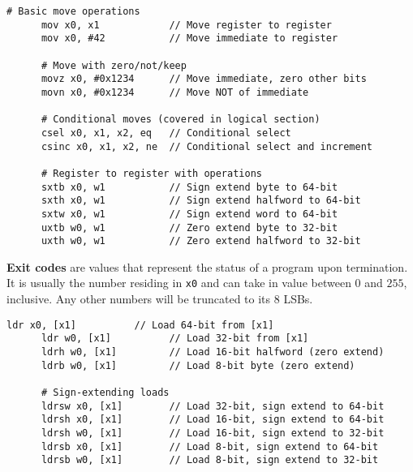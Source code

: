   \begin{definition}
    \begin{lstlisting}[language=arm]
      # Basic move operations
      mov x0, x1            // Move register to register
      mov x0, #42           // Move immediate to register
      
      # Move with zero/not/keep
      movz x0, #0x1234      // Move immediate, zero other bits
      movn x0, #0x1234      // Move NOT of immediate
      
      # Conditional moves (covered in logical section)
      csel x0, x1, x2, eq   // Conditional select
      csinc x0, x1, x2, ne  // Conditional select and increment
      
      # Register to register with operations
      sxtb x0, w1           // Sign extend byte to 64-bit
      sxth x0, w1           // Sign extend halfword to 64-bit
      sxtw x0, w1           // Sign extend word to 64-bit
      uxtb w0, w1           // Zero extend byte to 32-bit
      uxth w0, w1           // Zero extend halfword to 32-bit
    \end{lstlisting}
  \end{definition} 

  \begin{definition}
    \textbf{Exit codes} are values that represent the status of a program upon termination. It is usually the number residing in \texttt{x0} and can take in value between $0$ and $255$, inclusive. Any other numbers will be truncated to its 8 LSBs. 
  \end{definition}

  \begin{definition}
    \begin{lstlisting}[language=arm]
      ldr x0, [x1]          // Load 64-bit from [x1]
      ldr w0, [x1]          // Load 32-bit from [x1]
      ldrh w0, [x1]         // Load 16-bit halfword (zero extend)
      ldrb w0, [x1]         // Load 8-bit byte (zero extend)
      
      # Sign-extending loads
      ldrsw x0, [x1]        // Load 32-bit, sign extend to 64-bit
      ldrsh x0, [x1]        // Load 16-bit, sign extend to 64-bit
      ldrsh w0, [x1]        // Load 16-bit, sign extend to 32-bit
      ldrsb x0, [x1]        // Load 8-bit, sign extend to 64-bit
      ldrsb w0, [x1]        // Load 8-bit, sign extend to 32-bit
    \end{lstlisting}
  \end{definition}

